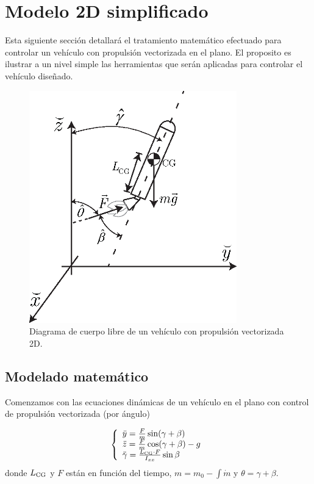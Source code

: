 
\section{Modelo 2D simplificado}

Esta siguiente sección detallará el tratamiento matemático efectuado para controlar un vehículo con propulsión vectorizada en el plano. El proposito es ilustrar a un nivel simple las herramientas que serán aplicadas para controlar el vehículo diseñado.

\begin{figure}[htb!]
	\centering
	\includegraphics[width=9cm]{fig/rocketFBD.eps}
	\caption{Diagrama de cuerpo libre de un vehículo con propulsión vectorizada 2D.}
	\label{fig:FBD2D}
\end{figure}


\subsection{Modelado matemático}
Comenzamos con las ecuaciones dinámicas de un vehículo en el plano con control de propulsión vectorizada (por ángulo)

\[
\left\{
\begin{array}{l}
	\ddot{y}=\frac{F}{m} \sin(\gamma+\beta) \\
	\ddot{z}=\frac{F}{m} \cos (\gamma+\beta)-g \\
	\ddot{\gamma} = \frac{L_{{\mathrm{CG}}}\cdot F}{I_{xx}}\sin\beta
\end{array}
\right.
\]
donde \(L_{\mathrm{CG}}\) y \(F\) están en función del tiempo, $m =m_0 - \int \dot{m} $ y $\theta = \gamma+\beta$. 

